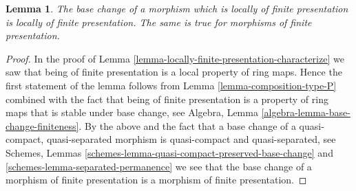 \documentclass[10pt,a4paper]{amsart}
\theoremstyle{plain}
\newtheorem{lemma}[subsection]{Lemma}
\theoremstyle{definition}
\theoremstyle{remark}
\numberwithin{equation}{subsection}
\begin{document}
\begin{lemma}
\label{lemma-base-change-finite-presentation}
The base change of a morphism which is locally of finite presentation
is locally of finite presentation. The same is true for morphisms of
finite presentation.
\end{lemma}

\begin{proof}
In the proof of Lemma \ref{lemma-locally-finite-presentation-characterize}
we saw that being of finite presentation is a local property of ring maps.
Hence the first statement of the lemma follows from
Lemma \ref{lemma-composition-type-P} combined
with the fact that being of finite presentation
is a property of ring maps that is
stable under base change, see
Algebra, Lemma \ref{algebra-lemma-base-change-finiteness}.
By the above and the fact that a base change of a
quasi-compact, quasi-separated morphism is quasi-compact
and quasi-separated, see
Schemes, Lemmas \ref{schemes-lemma-quasi-compact-preserved-base-change}
and \ref{schemes-lemma-separated-permanence}
we see that the base change of a morphism of finite presentation is
a morphism of finite presentation.
\end{proof}
\end{document}
